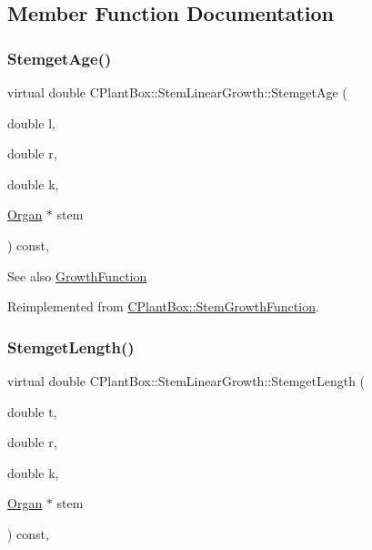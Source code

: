 \subsection{Member Function Documentation}
\mbox{\label{classCPlantBox_1_1StemLinearGrowth_a439989850767e6c1d334c9152a5ff5d7}} 
\subsubsection{\texorpdfstring{Stemget\+Age()}{StemgetAge()}}
{\footnotesize\ttfamily virtual double C\+Plant\+Box\+::\+Stem\+Linear\+Growth\+::\+Stemget\+Age (\begin{DoxyParamCaption}\item[{double}]{l,  }\item[{double}]{r,  }\item[{double}]{k,  }\item[{\hyperlink{classCPlantBox_1_1Organ}{Organ} $\ast$}]{stem }\end{DoxyParamCaption}) const\hspace{0.3cm}{\ttfamily [inline]}, {\ttfamily [virtual]}}

\begin{DoxySeeAlso}{See also}
\hyperlink{classCPlantBox_1_1GrowthFunction}{Growth\+Function} 
\end{DoxySeeAlso}


Reimplemented from \hyperlink{classCPlantBox_1_1StemGrowthFunction_a94c113c8b153e2cd7f3827f718024992}{C\+Plant\+Box\+::\+Stem\+Growth\+Function}.

\mbox{\label{classCPlantBox_1_1StemLinearGrowth_a32bf6f210d011546e25892c87a1e00ba}} 
\subsubsection{\texorpdfstring{Stemget\+Length()}{StemgetLength()}}
{\footnotesize\ttfamily virtual double C\+Plant\+Box\+::\+Stem\+Linear\+Growth\+::\+Stemget\+Length (\begin{DoxyParamCaption}\item[{double}]{t,  }\item[{double}]{r,  }\item[{double}]{k,  }\item[{\hyperlink{classCPlantBox_1_1Organ}{Organ} $\ast$}]{stem }\end{DoxyParamCaption}) const\hspace{0.3cm}{\ttfamily [inline]}, {\ttfamily [virtual]}}

